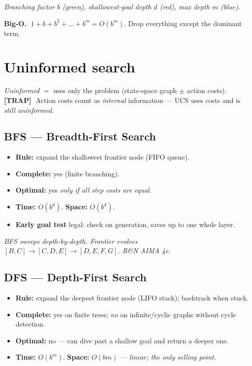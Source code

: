\documentclass[11pt, a4paper]{article}
\newcommand{\trapflag}{\textcolor{trapBd}{\textbf{[TRAP]}}\,}
\begin{document}
\begin{center}

\footnotesize\textit{Branching factor $b$ (green), shallowest-goal depth $d$ (red), max depth $m$ (blue).}
\end{center}

\textbf{Big-O.} $\;1 + b + b^2 + \dots + b^m = O(b^m)$. Drop everything except the dominant term.

\section{Uninformed search}

\emph{Uninformed} $=$ uses only the problem (state-space graph $\pm$ action costs). \trapflag\ Action costs count as \emph{internal} information --- UCS uses costs and is \emph{still uninformed}.

\subsection{BFS — Breadth-First Search}

\begin{card}
\begin{itemize}
  \item \textbf{Rule:} expand the shallowest frontier node (FIFO queue).
  \item \textbf{Complete:} yes (finite branching).
  \item \textbf{Optimal:} yes \emph{only if all step costs are equal}.
  \item \textbf{Time:} $O(b^d)$. \quad \textbf{Space:} $O(b^d)$.
  \item \textbf{Early goal test} legal: check on generation, saves up to one whole layer.
\end{itemize}
\end{card}

\begin{center}

\footnotesize\textit{BFS sweeps depth-by-depth. Frontier evolves $[B,C] \to [C,D,E] \to [D,E,F,G]$. R\&N AIMA 4e.}
\end{center}

\subsection{DFS — Depth-First Search}

\begin{card}
\begin{itemize}
  \item \textbf{Rule:} expand the deepest frontier node (LIFO stack); backtrack when stuck.
  \item \textbf{Complete:} yes on finite trees; \emph{no} on infinite/cyclic graphs without cycle detection.
  \item \textbf{Optimal:} no --- can dive past a shallow goal and return a deeper one.
  \item \textbf{Time:} $O(b^m)$. \quad \textbf{Space:} $O(bm)$ --- \emph{linear; the only selling point}.
\end{itemize}
\end{card}
\end{document}
